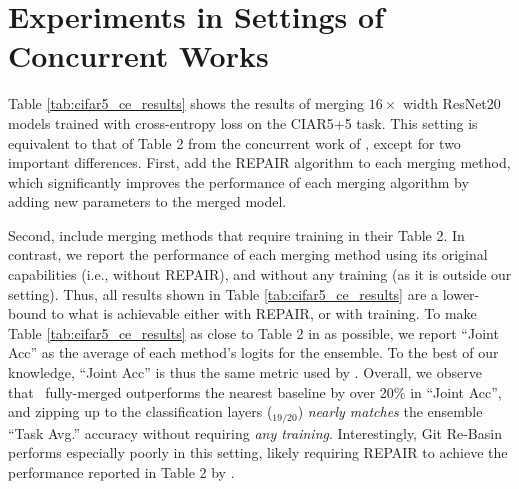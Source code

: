 \section{Experiments in Settings of Concurrent Works}
Table \ref{tab:cifar5_ce_results} shows the results of merging $16\times$ width ResNet20 models trained with cross-entropy loss on the CIAR5+5 task. 
This setting is equivalent to that of Table 2 from the concurrent work of \citep{yamada2023revisiting}, except for two important differences.
First, \citet{yamada2023revisiting} add the REPAIR \citet{jordan2022repair} algorithm to each merging method, which significantly improves the performance of each merging algorithm by adding new parameters to the merged model. 

Second, \citet{yamada2023revisiting} include merging methods that require training in their Table 2. 
In contrast, we report the performance of each merging method using its original capabilities (i.e., without REPAIR), and without any training (as it is outside our setting). 
Thus, all results shown in Table \ref{tab:cifar5_ce_results} are a lower-bound to what is achievable either with REPAIR, or with training. 
To make Table \ref{tab:cifar5_ce_results} as close to Table 2 in \citep{yamada2023revisiting} as possible, we report ``Joint Acc'' as the average of each method's logits for the ensemble. 
To the best of our knowledge, ``Joint Acc'' is thus the same metric used by \citep{yamada2023revisiting}.
Overall, we observe that \name{}\ fully-merged outperforms the nearest baseline by over 20\% in ``Joint Acc'', and zipping up to the classification layers (\name{}$_{19/20}$) \textit{nearly matches} the ensemble ``Task Avg.'' accuracy without requiring \textit{any training}.
Interestingly, Git Re-Basin performs especially poorly in this setting, likely requiring REPAIR to achieve the performance reported in Table 2 by \citep{yamada2023revisiting}. 